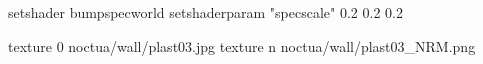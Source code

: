 setshader bumpspecworld
setshaderparam "specscale" 0.2 0.2 0.2

texture 0 noctua/wall/plast03.jpg
texture n noctua/wall/plast03_NRM.png
